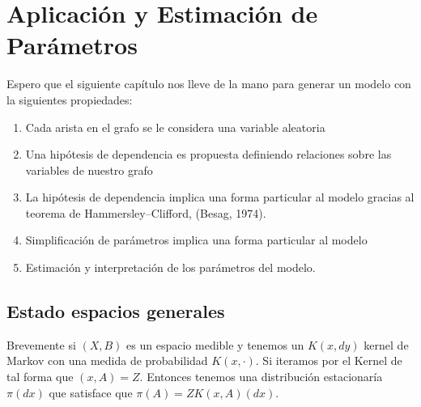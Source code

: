 \chapter{Aplicación y Estimación de Parámetros}


Espero que el siguiente capítulo nos lleve de la mano para generar un modelo con la siguientes propiedades:

\begin{enumerate}
    \item Cada arista en el grafo se le considera una variable aleatoria
    \item Una hipótesis de dependencia es propuesta definiendo relaciones sobre las variables de nuestro grafo
    \item La hipótesis de dependencia implica una forma particular al modelo gracias al teorema de Hammersley–Clifford, (Besag, 1974). 
    \item Simplificación de parámetros implica una forma particular al modelo
    \item Estimación y interpretación de los parámetros del modelo.
\end{enumerate}

\section{Estado espacios generales}

Brevemente si $(X , B)$ es un espacio medible y tenemos un $K(x, dy)$ kernel de Markov con una medida de probabilidad $K(x,\cdot )$. Si iteramos por el Kernel de tal forma que $(x, A) = Z$. Entonces tenemos una distribución estacionaría $\pi(dx)$ que satisface que $\pi(A) = ZK(x,A)(dx)$.


